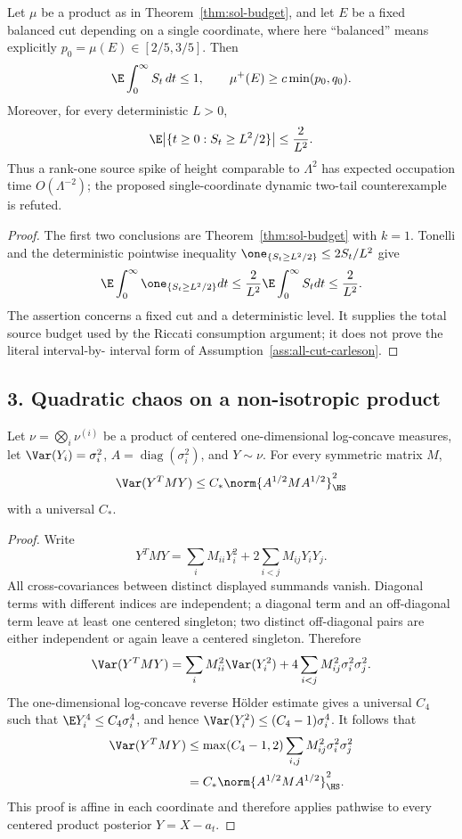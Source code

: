 \documentclass[../main.tex]{subfiles}
\begin{document}
\begin{corollary}[= Corollary~\ref{cor:refutation}]
\label{cor:sol-refutation}
Let $\mu$ be a product as in Theorem~\ref{thm:sol-budget}, and let $E$ be a fixed balanced cut
depending on a single coordinate, where here ``balanced'' means explicitly
$p_0=\mu(E)\in[2/5,3/5]$.  Then
\[
  \E\int_0^\infty S_t\,dt\le1,
  \qquad
  \mu^+(E)\ge c\min(p_0,q_0).
\]
Moreover, for every deterministic $L>0$,
\[
  \E\bigl|\{t\ge0:S_t\ge L^2/2\}\bigr|\le\frac2{L^2}.
\]
Thus a rank-one source spike of height comparable to $\Lambda^2$ has expected occupation time
$O(\Lambda^{-2})$; the proposed single-coordinate dynamic two-tail counterexample is refuted.
\end{corollary}

\begin{proof}
The first two conclusions are Theorem~\ref{thm:sol-budget} with $k=1$.  Tonelli and the
deterministic pointwise inequality
$\one_{\{S_t\ge L^2/2\}}\le2S_t/L^2$ give
\[
  \E\int_0^\infty\one_{\{S_t\ge L^2/2\}}dt
  \le\frac2{L^2}\E\int_0^\infty S_tdt\le\frac2{L^2}.
\]
The assertion concerns a fixed cut and a deterministic level.  It supplies the total source
budget used by the Riccati consumption argument; it does not prove the literal interval-by-
interval form of Assumption~\ref{ass:all-cut-carleson}.
\end{proof}

\subsection*{3. Quadratic chaos on a non-isotropic product}

\begin{lemma}[= Lemma~\ref{lem:product-qcts}]
\label{lem:sol-product-qcts}
Let $\nu=\bigotimes_i\nu^{(i)}$ be a product of centered one-dimensional log-concave measures,
let $\Var(Y_i)=\sigma_i^2$, $A=\operatorname{diag}(\sigma_i^2)$, and $Y\sim\nu$.  For every
symmetric matrix $M$,
\[
  \Var(Y^TMY)\le C_*\norm{A^{1/2}MA^{1/2}}_{\HS}^2
\]
with a universal $C_*$.
\end{lemma}

\begin{proof}
Write
\[
  Y^TMY=\sum_iM_{ii}Y_i^2+2\sum_{i<j}M_{ij}Y_iY_j.
\]
All cross-covariances between distinct displayed summands vanish.  Diagonal terms with
different indices are independent; a diagonal term and an off-diagonal term leave at least one
centered singleton; two distinct off-diagonal pairs are either independent or again leave a
centered singleton.  Therefore
\[
  \Var(Y^TMY)
  =\sum_iM_{ii}^2\Var(Y_i^2)
   +4\sum_{i<j}M_{ij}^2\sigma_i^2\sigma_j^2.
\]
The one-dimensional log-concave reverse H\"older estimate
\cite[Cor.~5]{KLnotes} gives a universal $C_4$ such that
$\E Y_i^4\le C_4\sigma_i^4$, and hence
$\Var(Y_i^2)\le(C_4-1)\sigma_i^4$.  It follows that
\begin{align*}
  \Var(Y^TMY)
  &\le\max(C_4-1,2)
       \sum_{i,j}M_{ij}^2\sigma_i^2\sigma_j^2\\
  &=C_*\norm{A^{1/2}MA^{1/2}}_{\HS}^2.
\end{align*}
This proof is affine in each coordinate and therefore applies pathwise to every centered product
posterior $Y=X-a_t$.
\end{proof}
\end{document}
